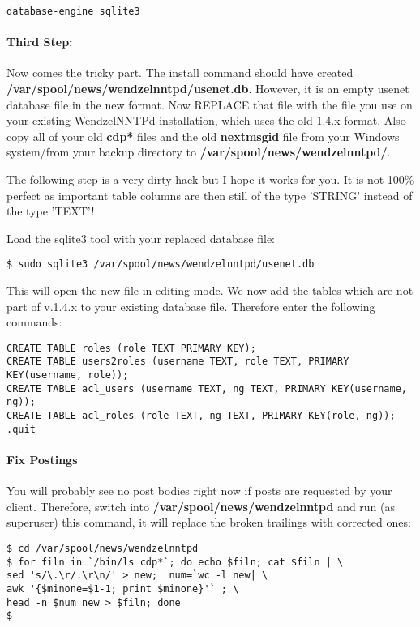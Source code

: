 \begin{verbatim}
database-engine sqlite3
\end{verbatim}

\paragraph*{Third Step:}
Now comes the tricky part. The install command should have created
\textbf{/var/spool/news/wendzelnntpd/usenet.db}.
However, it is an empty usenet database file in the new format.
Now REPLACE that file with the file you use on your existing WendzelNNTPd installation, which uses the old 1.4.x format. Also copy all of your old \textbf{cdp*} files and the old \textbf{nextmsgid} file from your Windows system/from your backup directory to \textbf{/var/spool/news/wendzelnntpd/}.

The following step is a very dirty hack but I hope it works for you. It is not 100\% perfect as important table columns are then still of the type 'STRING' instead of the type 'TEXT'!

Load the sqlite3 tool with your replaced database file:

\begin{verbatim}
$ sudo sqlite3 /var/spool/news/wendzelnntpd/usenet.db
\end{verbatim}

This will open the new file in editing mode. We now add the tables which are not part of v.1.4.x to your existing database file. Therefore enter the following commands:

\begin{verbatim}
CREATE TABLE roles (role TEXT PRIMARY KEY);
CREATE TABLE users2roles (username TEXT, role TEXT, PRIMARY KEY(username, role));
CREATE TABLE acl_users (username TEXT, ng TEXT, PRIMARY KEY(username, ng));
CREATE TABLE acl_roles (role TEXT, ng TEXT, PRIMARY KEY(role, ng));
.quit
\end{verbatim}


\paragraph*{Fix Postings}

You will probably see no post bodies right now if posts are requested by your client. Therefore, switch into \textbf{/var/spool/news/wendzelnntpd} and run (as superuser) this command, it will replace the broken trailings with corrected ones:

\begin{verbatim}
$ cd /var/spool/news/wendzelnntpd
$ for filn in `/bin/ls cdp*`; do echo $filn; cat $filn | \
sed 's/\.\r/.\r\n/' > new;  num=`wc -l new| \
awk '{$minone=$1-1; print $minone}'` ; \
head -n $num new > $filn; done
$
\end{verbatim}

